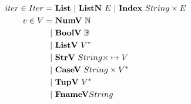 \begin{align*}
%
  iter \in Iter =& ~ \listiter ~ | ~ \listniter ~ E ~|~ \listidxiter ~ String \times E \\
%
  v \in V =& ~ \numv ~ \mathbb N \\
    | & ~ \boolv ~ \mathbb B \\
    | & ~ \listv ~ \seq V \\
    | & ~ \strv ~ String \times \mapsto V \\
    | & ~ \casev ~ String \times \seq V \\
    | & ~ \tupv ~ \seq V \\
    | & ~ \fnamev String \\
\end{align*}




\newpage

